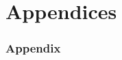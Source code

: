\beginbackup
\appendix
\section{Appendices}

\begin{frame}
\frametitle{Appendix}

\end{frame}
\backupend